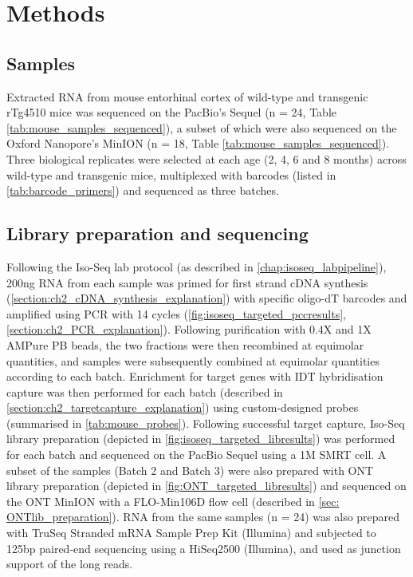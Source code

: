  

\section{Methods}

\subsection{Samples}
Extracted RNA from mouse entorhinal cortex of wild-type and transgenic rTg4510 mice was sequenced on the PacBio's Sequel (n = 24, Table \ref{tab:mouse_samples_sequenced}), a subset of which were also sequenced on the Oxford Nanopore's MinION (n = 18, Table \ref{tab:mouse_samples_sequenced}). Three biological replicates were selected at each age (2, 4, 6 and 8 months) across wild-type and transgenic mice, multiplexed with barcodes (listed in \cref{tab:barcode_primers}) and sequenced as three batches.

\subsection{Library preparation and sequencing}
Following the Iso-Seq lab protocol (as described in \cref{chap:isoseq_labpipeline}), 200ng RNA from each sample was primed for first strand cDNA synthesis (\cref{section:ch2_cDNA_synthesis_explanation}) with specific oligo-dT barcodes and amplified using PCR with 14 cycles (\cref{fig:isoseq_targeted_pccresults}, \cref{section:ch2_PCR_explanation}). Following purification with 0.4X and 1X AMPure PB beads, the two fractions were then recombined at equimolar quantities, and samples were subsequently combined at equimolar quantities according to each batch. Enrichment for target genes with IDT hybridisation capture was then performed for each batch (described in \cref{section:ch2_targetcapture_explanation}) using custom-designed probes (summarised in \cref{tab:mouse_probes}). Following successful target capture, Iso-Seq library preparation (depicted in \cref{fig:isoseq_targeted_libresults}) was performed for each batch and sequenced on the PacBio Sequel using a 1M SMRT cell. A subset of the samples (Batch 2 and Batch 3) were also prepared with ONT library preparation (depicted in \cref{fig:ONT_targeted_libresults}) and sequenced on the ONT MinION with a FLO-Min106D flow cell (described in \cref{sec: ONTlib_preparation}). RNA from the same samples (n = 24) was also prepared with TruSeq Stranded mRNA Sample Prep Kit (Illumina) and subjected to 125bp paired-end sequencing using a HiSeq2500 (Illumina), and used as junction support of the long reads. 

